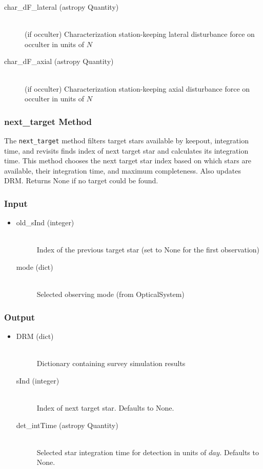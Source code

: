 \documentclass[cleanfoot]{asme2ej}
\begin{document}
\begin{itemize}
\begin{description}
\begin{description}
        \item[char\_dF\_lateral (astropy Quantity)] \hfill \\ (if occulter) Characterization station-keeping lateral disturbance force on occulter in units of $ N $
        \item[char\_dF\_axial (astropy Quantity)] \hfill \\ (if occulter) Characterization station-keeping axial disturbance force on occulter in units of $ N $
    \end{description}
\end{description}
\end{itemize}

\subsubsection{next\_target Method} \label{sec:nexttargettask}
The \verb+next_target+ method filters target stars available by keepout, integration time, and revisits
finds index of next target star and calculates its integration time. This method chooses the next target star index based on which stars are available, their integration time, and maximum completeness. Also updates DRM. Returns None if no target could be found.
\subsubsection*{Input}
\begin{itemize}
\item 
\begin{description}
    \item[old\_sInd (integer)] \hfill \\ Index of the previous target star (set to None for the first observation)
    \item[mode (dict)] \hfill \\ Selected observing mode (from OpticalSystem)
\end{description}
\end{itemize}
\subsubsection*{Output}
\begin{itemize}
\item 
\begin{description}
    \item[DRM (dict)] \hfill \\ Dictionary containing survey simulation results
    \item[sInd (integer)] \hfill \\ Index of next target star. Defaults to None.
    \item[det\_intTime (astropy Quantity)] \hfill \\ Selected star integration time for detection in units of $day$. Defaults to None.
\end{description}
\end{itemize}
\end{document}
